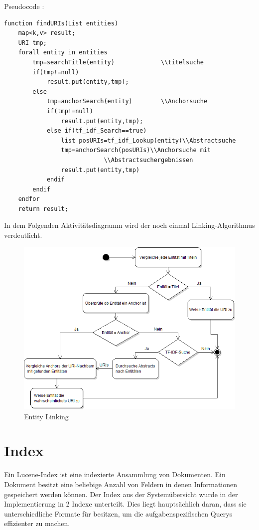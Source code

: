 \documentclass[11pt, a4paper, oneside]{Thesis} %
\begin{document}
Pseudocode :
\begin{lstlisting}
function findURIs(List entities)
	map<k,v> result;
	URI tmp;
	forall entity in entities
		tmp=searchTitle(entity)				\\titelsuche
		if(tmp!=null)
			result.put(entity,tmp);
		else
			tmp=anchorSearch(entity)		\\Anchorsuche
			if(tmp!=null)
				result.put(entity,tmp);
			else if(tf_idf_Search==true)
				list posURIs=tf_idf_Lookup(entity)\\Abstractsuche
				tmp=anchorSearch(posURIs)\\Anchorsuche mit 
							\\Abstractsuchergebnissen
				result.put(entity,tmp)
			endif
		endif
	endfor
	return result;
\end{lstlisting}
\clearpage
In dem Folgenden Aktivit\"atsdiagramm wird der noch einmal Linking-Algorithmus verdeutlicht.
\begin{figure}[ht!]
\centering
\includegraphics[scale=0.55]{./ablauf.png}
\caption[Entity Linking]{Entity Linking}
\end{figure}


\section{Index}
Ein Lucene-Index ist eine indexierte Ansammlung von Dokumenten. Ein Dokument besitzt eine beliebige Anzahl von Feldern in denen Informationen gespeichert werden k\"onnen. 
Der Index aus der System\"ubersicht wurde in der Implementierung in 2 Indexe unterteilt. Dies liegt haupts\"achlich daran, dass sie unterschiedliche Formate f\"ur besitzen, um die aufgabenspezifischen Querys effizienter zu machen.
\end{document}
